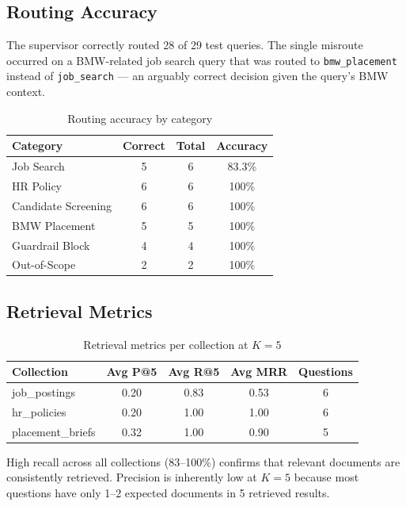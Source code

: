 \documentclass[12pt, a4paper]{article}
\begin{document}
\subsection{Routing Accuracy}

The supervisor correctly routed 28 of 29 test queries. The single misroute occurred on a BMW-related job search query that was routed to \texttt{bmw\_placement} instead of \texttt{job\_search} — an arguably correct decision given the query's BMW context.

\begin{table}[H]
\centering
\caption{Routing accuracy by category}
\begin{tabular}{l c c c}
\toprule
\textbf{Category} & \textbf{Correct} & \textbf{Total} & \textbf{Accuracy} \\
\midrule
Job Search & 5 & 6 & 83.3\% \\
HR Policy & 6 & 6 & 100\% \\
Candidate Screening & 6 & 6 & 100\% \\
BMW Placement & 5 & 5 & 100\% \\
Guardrail Block & 4 & 4 & 100\% \\
Out-of-Scope & 2 & 2 & 100\% \\
\bottomrule
\end{tabular}
\label{tab:routing}
\end{table}

\subsection{Retrieval Metrics}

\begin{table}[H]
\centering
\caption{Retrieval metrics per collection at $K=5$}
\begin{tabular}{l c c c c}
\toprule
\textbf{Collection} & \textbf{Avg P@5} & \textbf{Avg R@5} & \textbf{Avg MRR} & \textbf{Questions} \\
\midrule
job\_postings & 0.20 & 0.83 & 0.53 & 6 \\
hr\_policies & 0.20 & 1.00 & 1.00 & 6 \\
placement\_briefs & 0.32 & 1.00 & 0.90 & 5 \\
\bottomrule
\end{tabular}
\label{tab:retrieval}
\end{table}

High recall across all collections (83--100\%) confirms that relevant documents are consistently retrieved. Precision is inherently low at $K=5$ because most questions have only 1--2 expected documents in 5 retrieved results.
\end{document}
